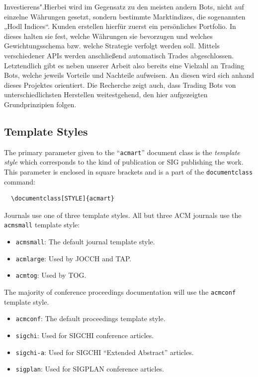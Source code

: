 \documentclass[sigconf]{acmart}
\begin{document}
Investierens".\newline Hierbei wird im Gegensatz zu den meisten andern Bots, nicht auf einzelne Währungen
gesetzt, sondern bestimmte Marktindizes, die sogenannten „Hodl Indices“. Kunden erstellen hierfür
zuerst ein persönliches Portfolio. In dieses halten sie fest, welche Währungen sie bevorzugen und
welches Gewichtungsschema bzw. welche Strategie verfolgt werden soll. Mittels verschiedener APIs
werden anschließend automatisch Trades abgeschlossen.\newline
Letztendlich gibt es neben unserer Arbeit also bereits eine Vielzahl an Trading Bots, welche jeweils
Vorteile und Nachteile aufweisen. An diesen wird sich anhand dieses Projektes orientiert. Die
Recherche zeigt auch, dass Trading Bots von unterschiedlichsten Herstellen weitestgehend, den hier
aufgezeigten Grundprinzipien folgen.

\subsection{Template Styles}

The primary parameter given to the ``\verb|acmart|'' document class is
the {\itshape template style} which corresponds to the kind of publication
or SIG publishing the work. This parameter is enclosed in square
brackets and is a part of the {\verb|documentclass|} command:
\begin{verbatim}
  \documentclass[STYLE]{acmart}
\end{verbatim}

Journals use one of three template styles. All but three ACM journals
use the {\verb|acmsmall|} template style:
\begin{itemize}
\item {\verb|acmsmall|}: The default journal template style.
\item {\verb|acmlarge|}: Used by JOCCH and TAP.
\item {\verb|acmtog|}: Used by TOG.
\end{itemize}

The majority of conference proceedings documentation will use the {\verb|acmconf|} template style.
\begin{itemize}
\item {\verb|acmconf|}: The default proceedings template style.
\item{\verb|sigchi|}: Used for SIGCHI conference articles.
\item{\verb|sigchi-a|}: Used for SIGCHI ``Extended Abstract'' articles.
\item{\verb|sigplan|}: Used for SIGPLAN conference articles.
\end{itemize}
\end{document}
